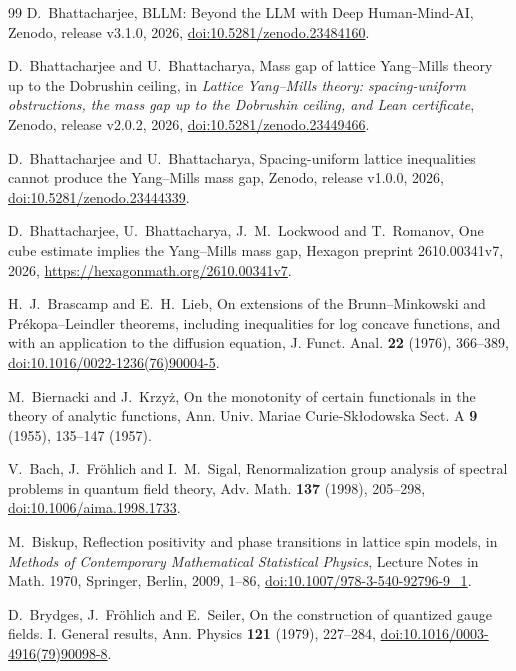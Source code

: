 \documentclass[aps,prd,twocolumn,superscriptaddress,nofootinbib,longbibliography,floatfix,amsmath,amssymb,10pt]{revtex4-2}
\theoremstyle{definition}
\theoremstyle{remark}
\begin{document}
\begin{thebibliography}{99}
D.~Bhattacharjee, BLLM: Beyond the LLM with Deep Human-Mind-AI, Zenodo,
release v3.1.0, 2026,
\href{https://doi.org/10.5281/zenodo.23484160}{doi:10.5281/zenodo.23484160}.

D.~Bhattacharjee and U.~Bhattacharya, Mass gap of lattice Yang--Mills theory
up to the Dobrushin ceiling, in \emph{Lattice Yang--Mills theory: spacing-uniform
obstructions, the mass gap up to the Dobrushin ceiling, and Lean certificate},
Zenodo, release v2.0.2, 2026,
\href{https://doi.org/10.5281/zenodo.23449466}{doi:10.5281/zenodo.23449466}.

D.~Bhattacharjee and U.~Bhattacharya, Spacing-uniform lattice inequalities
cannot produce the Yang--Mills mass gap, Zenodo, release v1.0.0, 2026,
\href{https://doi.org/10.5281/zenodo.23444339}{doi:10.5281/zenodo.23444339}.

D.~Bhattacharjee, U.~Bhattacharya, J.~M.~Lockwood and T.~Romanov, One cube
estimate implies the Yang--Mills mass gap, Hexagon preprint 2610.00341v7,
2026, \url{https://hexagonmath.org/2610.00341v7}.

H.~J.~Brascamp and E.~H.~Lieb, On extensions of the Brunn--Minkowski and
Pr\'ekopa--Leindler theorems, including inequalities for log concave
functions, and with an application to the diffusion equation, J. Funct.
Anal. \textbf{22} (1976), 366--389,
\href{https://doi.org/10.1016/0022-1236(76)90004-5}{doi:10.1016/0022-1236(76)90004-5}.

M.~Biernacki and J.~Krzy\.z, On the monotonity of certain functionals in the theory of analytic functions, Ann. Univ. Mariae Curie-Sk{\l}odowska Sect. A \textbf{9} (1955), 135--147 (1957).

V.~Bach, J.~Fr\"ohlich and I.~M.~Sigal, Renormalization group analysis of
spectral problems in quantum field theory, Adv. Math. \textbf{137} (1998),
205--298,
\href{https://doi.org/10.1006/aima.1998.1733}{doi:10.1006/aima.1998.1733}.

M.~Biskup, Reflection positivity and phase transitions in lattice spin
models, in \emph{Methods of Contemporary Mathematical Statistical Physics},
Lecture Notes in Math. 1970, Springer, Berlin, 2009, 1--86,
\href{https://doi.org/10.1007/978-3-540-92796-9_1}{doi:10.1007/978-3-540-92796-9\_1}.

D.~Brydges, J.~Fr\"ohlich and E.~Seiler, On the construction of quantized gauge fields. I. General results, Ann. Physics \textbf{121} (1979), 227--284, \href{https://doi.org/10.1016/0003-4916(79)90098-8}{doi:10.1016/0003-4916(79)90098-8}.


\end{thebibliography}
\end{document}
